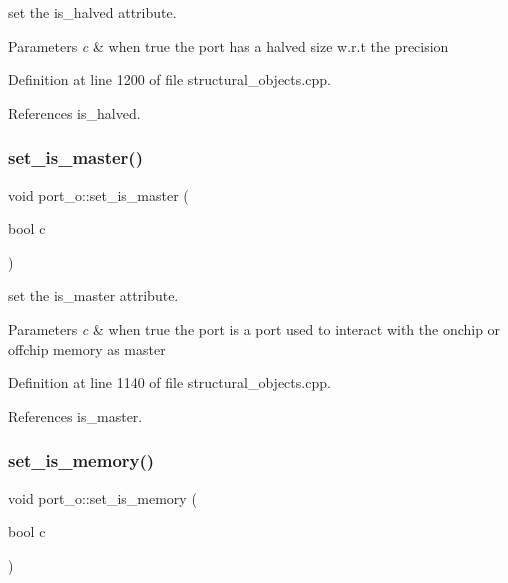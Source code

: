set the is\+\_\+halved attribute. 


\begin{DoxyParams}{Parameters}
{\em c} & when true the port has a halved size w.\+r.\+t the precision \\
\hline
\end{DoxyParams}


Definition at line 1200 of file structural\+\_\+objects.\+cpp.



References is\+\_\+halved.

\mbox{\label{structport__o_a5564c529a4a5c479de4c8c044a453149}} 
\subsubsection{\texorpdfstring{set\+\_\+is\+\_\+master()}{set\_is\_master()}}
{\footnotesize\ttfamily void port\+\_\+o\+::set\+\_\+is\+\_\+master (\begin{DoxyParamCaption}\item[{bool}]{c }\end{DoxyParamCaption})}



set the is\+\_\+master attribute. 


\begin{DoxyParams}{Parameters}
{\em c} & when true the port is a port used to interact with the onchip or offchip memory as master \\
\hline
\end{DoxyParams}


Definition at line 1140 of file structural\+\_\+objects.\+cpp.



References is\+\_\+master.

\mbox{\label{structport__o_a7b1185147aed925a409401cd21d874fb}} 
\subsubsection{\texorpdfstring{set\+\_\+is\+\_\+memory()}{set\_is\_memory()}}
{\footnotesize\ttfamily void port\+\_\+o\+::set\+\_\+is\+\_\+memory (\begin{DoxyParamCaption}\item[{bool}]{c }\end{DoxyParamCaption})}



